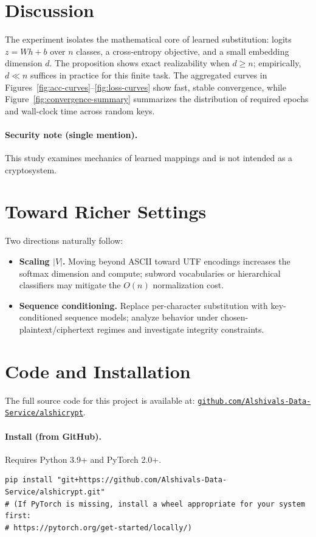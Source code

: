\documentclass[12pt]{article}
\begin{document}
\section{Discussion}
The experiment isolates the mathematical core of learned substitution: logits $z=Wh+b$ over $n$ classes, a cross-entropy objective, and a small embedding dimension $d$. The proposition shows exact realizability when $d\ge n$; empirically, $d\ll n$ suffices in practice for this finite task. The aggregated curves in Figures~\ref{fig:acc-curves}--\ref{fig:loss-curves} show fast, stable convergence, while Figure~\ref{fig:convergence-summary} summarizes the distribution of required epochs and wall-clock time across random keys.

\paragraph{Security note (single mention).} This study examines mechanics of learned mappings and is not intended as a cryptosystem.

\section{Toward Richer Settings}
Two directions naturally follow:
\begin{itemize}
    \item \textbf{Scaling $|V|$.} Moving beyond ASCII toward UTF encodings increases the softmax dimension and compute; subword vocabularies or hierarchical classifiers may mitigate the $O(n)$ normalization cost.
    \item \textbf{Sequence conditioning.} Replace per-character substitution with key-conditioned sequence models; analyze behavior under chosen-plaintext/ciphertext regimes and investigate integrity constraints.
\end{itemize}

\section{Code and Installation}
The full source code for this project is available at:
\href{https://github.com/Alshivals-Data-Service/alshicrypt}{\texttt{github.com/Alshivals-Data-Service/alshicrypt}}.

\paragraph{Install (from GitHub).}
Requires Python 3.9+ and PyTorch 2.0+.
\begin{verbatim}
pip install "git+https://github.com/Alshivals-Data-Service/alshicrypt.git"
# (If PyTorch is missing, install a wheel appropriate for your system first:
# https://pytorch.org/get-started/locally/)
\end{verbatim}
\end{document}
